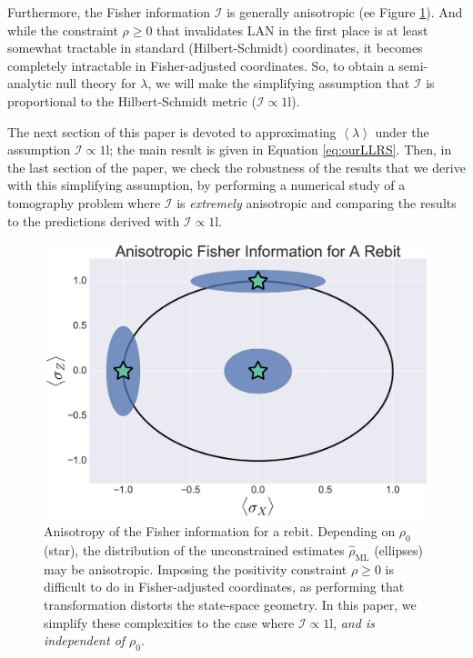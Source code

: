 \documentclass[aps,pra, twocolumn]{revtex4-1}
\newcommand{\Id}{\mathbb{I}}
\newcommand{\expect}[1]{\ensuremath{\left\langle#1\right\rangle}}
\def\Id{1\!\mathrm{l}}
\begin{document}
Furthermore, the Fisher information $\mathcal{I}$ is generally anisotropic (ee Figure \ref{fig:anisofi}). And while the constraint $\rho\geq0$ that invalidates LAN in the first place is at least somewhat tractable in standard (Hilbert-Schmidt) coordinates, it becomes completely intractable in Fisher-adjusted coordinates.  So, to obtain a semi-analytic null theory for $\lambda$, we will make the simplifying assumption that $\mathcal{I}$ is proportional to the Hilbert-Schmidt metric ($\mathcal{I} \propto \Id$).

The next section of this paper is devoted to approximating $\expect{\lambda}$ under the assumption $\mathcal{I} \propto \Id$; the main result is given in Equation \eqref{eq:ourLLRS}.  Then, in the last section of the paper, we check the robustness of the results that we derive with this simplifying assumption, by performing a numerical study of a tomography problem where $\mathcal{I}$ is \emph{extremely} anisotropic and comparing the results to the predictions derived with $\mathcal{I} \propto \Id$.

\begin{figure}
\includegraphics[width=\columnwidth]{Images/Figure_2.pdf}
 \caption{Anisotropy of the Fisher information for a rebit. Depending on $\rho_{0}$ (star), the distribution of the unconstrained estimates $\hat{\rho}_{\mathrm{ML}}$ (ellipses) may be anisotropic. Imposing the positivity constraint $\rho \geq 0$ is difficult to do in Fisher-adjusted coordinates, as performing that transformation distorts the state-space geometry. In this paper, we simplify these complexities to the case where $\mathcal{I} \propto \Id$, \emph{and is independent of $\rho_{0}$}.}
\label{fig:anisofi}
\end{figure}
\end{document}
